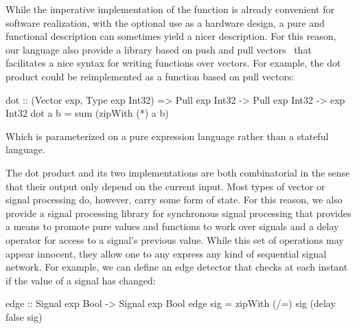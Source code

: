 \documentclass[../main.tex]{subfiles}
\begin{document}
While the imperative implementation of the  function is already convenient for software realization, with the optional use as a hardware design, a pure and functional description can sometimes yield a nicer description. For this reason, our language also provide a library based on push and pull vectors~\cite{claessen2012} that facilitates a nice syntax for writing functions over vectors. For example, the dot product could be reimplemented as a function based on pull vectors:

\begin{code}
dot :: (Vector exp, Type exp Int32) => Pull exp Int32 -> Pull exp Int32
    -> exp Int32
dot a b = sum (zipWith (*) a b)
\end{code}

\noindent Which is parameterized on a pure expression language  rather than a stateful language.


The dot product and its two implementations are both combinatorial in the sense that their output only depend on the current input. Most types of vector or signal processing do, however, carry some form of state. For this reason, we also provide a signal processing library for synchronous signal processing that provides a means to promote pure values and functions to work over signals and a delay operator for access to a signal's previous value. While this set of operations may appear innocent, they allow one to any express any kind of sequential signal network. For example, we can define an edge detector that checks at each instant if the value of a signal has changed:


\begin{code}
edge :: Signal exp Bool -> Signal exp Bool
edge sig = zipWith (/=) sig (delay false sig)
\end{code}




\end{document}
